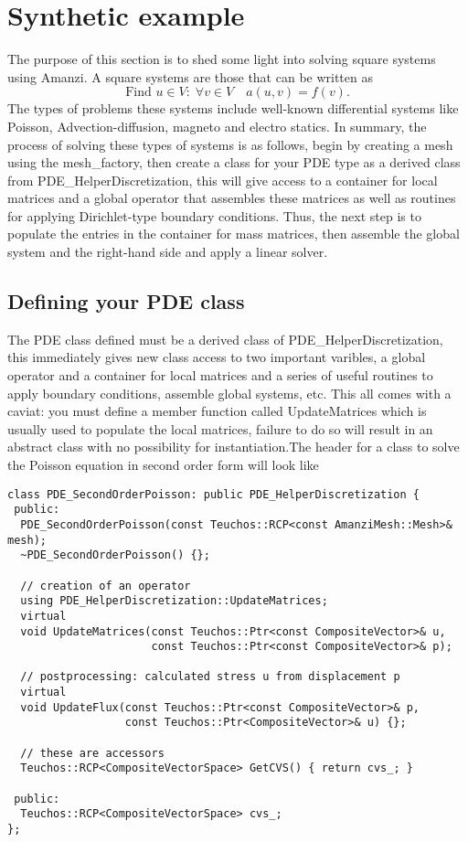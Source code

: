 \section{Synthetic example}
The purpose of this section is to shed some light into solving square systems using Amanzi. A square systems are those that can be written as
%
\begin{equation}
\mbox{Find }u\in V:\;\forall v\in V\quad
a(u,v) = f(v).
\end{equation}
The types of problems these systems include well-known differential systems like Poisson, Advection-diffusion, magneto and electro statics. In summary, the process of solving these types of systems is as follows, begin by creating a mesh using the mesh\_factory, then create a class for your PDE type as a derived class from PDE\_HelperDiscretization, this will give access to a container for local matrices and a global operator that assembles these matrices as well as routines for applying Dirichlet-type boundary conditions. Thus, the next step is to populate the entries in the container for mass matrices, then assemble the global system and the right-hand side and apply a linear solver.\\


\subsection{Defining your PDE class}\label{Sec:PDEClass}
The PDE class defined must be a derived class of PDE\_HelperDiscretization, this immediately gives 
new class access to two important varibles, a global operator and a container for local matrices and a series of useful routines to apply boundary conditions, assemble global systems, etc. This all comes with a caviat: you must define a member function called UpdateMatrices which is usually used to populate the local matrices, failure to do so will result in an abstract class with no possibility for instantiation.The header for a class to solve the Poisson equation in second order form will look like
%
\begin{lstlisting}
class PDE_SecondOrderPoisson: public PDE_HelperDiscretization {
 public:
  PDE_SecondOrderPoisson(const Teuchos::RCP<const AmanziMesh::Mesh>& mesh);
  ~PDE_SecondOrderPoisson() {};

  // creation of an operator
  using PDE_HelperDiscretization::UpdateMatrices;
  virtual
  void UpdateMatrices(const Teuchos::Ptr<const CompositeVector>& u,
                      const Teuchos::Ptr<const CompositeVector>& p);
		
  // postprocessing: calculated stress u from displacement p
  virtual
  void UpdateFlux(const Teuchos::Ptr<const CompositeVector>& p,
                  const Teuchos::Ptr<CompositeVector>& u) {};
		
  // these are accessors
  Teuchos::RCP<CompositeVectorSpace> GetCVS() { return cvs_; }

 public:
  Teuchos::RCP<CompositeVectorSpace> cvs_;
};
\end{lstlisting}


